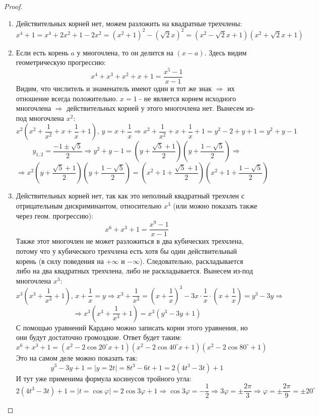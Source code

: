 \documentclass[12pt]{article}
\theoremstyle{definition}
\begin{document}
\begin{proof}\hfill
	\begin{enumerate}[label=\arabic*)]
		\item Действительных корней нет, можем разложить на квадратные трехчлены:
		$$
			x^4 + 1 = x^4 + 2x^2 + 1 - 2x^2 =(x^2+1)^2 - (\sqrt{2}x)^2 = (x^2 - \sqrt{2}x +1 )(x^2 + \sqrt{2}x + 1)
		$$
		\item Если есть корень $a$ у многочлена, то он делится на $(x-a)$. Здесь видим геометрическую прогрессию:
		$$
			x^4 + x^3 + x^2 + x + 1 = \dfrac{x^5 - 1}{x-1}
		$$
		Видим, что числитель и знаменатель имеют один и тот же знак $\Rightarrow$ их отношение всегда положительно. $x = 1$ - не является корнем исходного многочлена $\Rightarrow$ действительных корней у этого многочлена нет. Вынесем из-под многочлена $x^2$:
		$$
			x^2\left(x^2 + \dfrac{1}{x^2} + x + \dfrac{1}{x} + 1 \right), \, y = x + \dfrac{1}{x} \Rightarrow x^2 + \dfrac{1}{x^2} + x + \dfrac{1}{x} + 1  = y^2 - 2 + y + 1 = y^2 + y -1
		$$
		$$
			y_{1,2} = \dfrac{-1 \pm \sqrt{5}}{2} \Rightarrow y^2 + y -1 = \left(y  + \dfrac{\sqrt{5}+1}{2}\right)\left(y  + \dfrac{1-\sqrt{5}}{2}\right) \Rightarrow
		$$
		$$
			\Rightarrow x^2\left(y  + \dfrac{\sqrt{5}+1}{2}\right)\left(y  + \dfrac{1-\sqrt{5}}{2}\right) = \left(x^2 + 1  + \dfrac{\sqrt{5}+1}{2}\right)\left(x^2 + 1  + \dfrac{1-\sqrt{5}}{2}\right)
		$$
		\item Действительных корней нет, так как это неполный квадратный трехчлен с отрицательным дискриминантом, относительно $x^3$ (или  можно показать также через геом. прогрессию):
		$$
			x^6 + x^3 + 1 = \dfrac{x^9 -1}{x-1}
		$$
		Также этот многочлен не может разложиться в два кубических трехчлена, потому что у кубического трехчлена есть хотя бы один действительный корень (в силу поведения на $+ \infty$ и $-\infty$). Следовательно, раскладывается либо на два квадратных трехчлена, либо не раскладывается. Вынесем из-под многочлена $x^3$:
		$$
			x^3\left(x^3 + \dfrac{1}{x^3} + 1\right), \, x + \dfrac{1}{x} = y \Rightarrow x^3 + \dfrac{1}{x^3} = \left(x + \dfrac{1}{x}\right)^3  - 3x{\cdot}\dfrac{1}{x}{\cdot}\left(x + \dfrac{1}{x}\right) = y^3 - 3y \Rightarrow 
		$$
		$$
			\Rightarrow x^3\left(x^3 + \dfrac{1}{x^3} + 1\right) = x^3(y^3 -3y + 1)
		$$
		С помощью уравнений Кардано можно записать корни этого уравнения, но они будут достаточно громоздкие. Ответ будет таким:
		$$
			x^6 + x^3 + 1 = (x^2 -2\cos{20^{\circ}}x + 1)(x^2 - 2\cos{40^{\circ}}x+1)(x^2 - 2\cos{80^{\circ}} + 1)
		$$
		Это на самом деле можно показать так:
		$$
			y^3 -3y + 1 = | y = 2t| = 8t^3 - 6t + 1 = 2(4t^3 - 3t) +1
		$$
		И тут уже применима формула косинусов тройного угла:
		$$
			2(4t^3 - 3t) +1 = |t = \cos{\varphi}| = 2 \cos{3\varphi  } + 1 \Rightarrow \cos{3\varphi} = -\dfrac{1}{2} \Rightarrow 3\varphi = \pm \dfrac{2\pi}{3} \Rightarrow \varphi = \pm \dfrac{2\pi}{9} = \pm 20^{\circ}
		$$
	\end{enumerate}
\end{proof}
\end{document}
